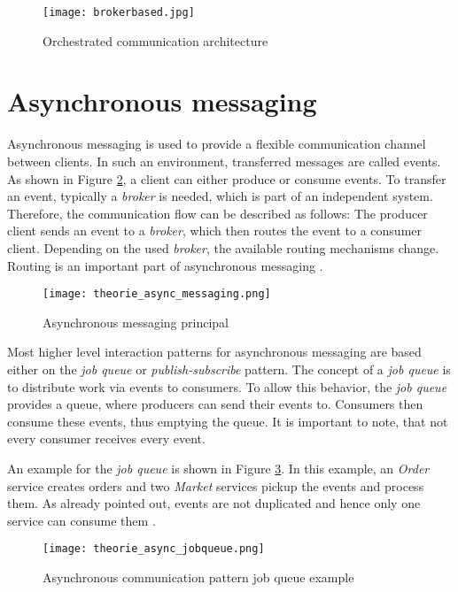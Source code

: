 \begin{figure}[h]
	\centering
	\texttt{[image: brokerbased.jpg]}
	\caption{Orchestrated communication architecture \cite{NoorainPanjwani.2020}}
	\label{img:orchestratedCommunication}
\end{figure}

\section{Asynchronous messaging}\label{cha:Theory:async}

Asynchronous messaging is used to provide a flexible communication channel between clients.
In such an environment, transferred messages are called events.
As shown in Figure \ref{img:asyncMessagignPrincipal}, a client can either produce or consume events.
To transfer an event, typically a \textit{broker} is needed, which is part of an independent system.
Therefore, the communication flow can be described as follows:
The producer client sends an event to a \textit{broker}, which then routes the event to a consumer client.
Depending on the used \textit{broker}, the available routing mechanisms change.
Routing is an important part of asynchronous messaging \cite[p.~62f.]{Bruce.2019}.

\begin{figure}[h]
	\centering
	\texttt{[image: theorie\_async\_messaging.png]}
	\caption{Asynchronous messaging principal}
	\label{img:asyncMessagignPrincipal}
\end{figure}

Most higher level interaction patterns for asynchronous messaging are based either on the \textit{job queue} or \textit{publish-subscribe} pattern.
The concept of a \textit{job queue} is to distribute work via events to consumers.
To allow this behavior, the \textit{job queue} provides a queue, where producers can send their events to.
Consumers then consume these events, thus emptying the queue.
It is important to note, that not every consumer receives every event.

An example for the \textit{job queue} is shown in Figure \ref{img:asyncJobQueue}.
In this example, an \textit{Order} service creates orders and two \textit{Market} services pickup the events and process them.
As already pointed out, events are not duplicated and hence only one service can consume them \cite[p.~63f.]{Bruce.2019}.

\begin{figure}
	\centering
	\texttt{[image: theorie\_async\_jobqueue.png]}
	\caption{Asynchronous communication pattern job queue example \cite[p.~64]{Bruce.2019}}
	\label{img:asyncJobQueue}
\end{figure}


